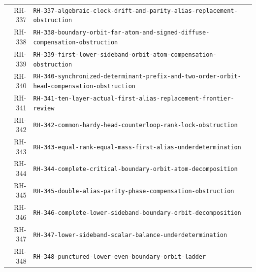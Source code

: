 \begin{longtable}{r >{\raggedright\arraybackslash}p{}}
RH-337 & \texttt{RH-\allowbreak{}337-\allowbreak{}algebraic-\allowbreak{}clock-\allowbreak{}drift-\allowbreak{}and-\allowbreak{}parity-\allowbreak{}alias-\allowbreak{}replacement-\allowbreak{}obstruction}\\
RH-338 & \texttt{RH-\allowbreak{}338-\allowbreak{}boundary-\allowbreak{}orbit-\allowbreak{}far-\allowbreak{}atom-\allowbreak{}and-\allowbreak{}signed-\allowbreak{}diffuse-\allowbreak{}compensation-\allowbreak{}obstruction}\\
RH-339 & \texttt{RH-\allowbreak{}339-\allowbreak{}first-\allowbreak{}lower-\allowbreak{}sideband-\allowbreak{}orbit-\allowbreak{}atom-\allowbreak{}compensation-\allowbreak{}obstruction}\\
RH-340 & \texttt{RH-\allowbreak{}340-\allowbreak{}synchronized-\allowbreak{}determinant-\allowbreak{}prefix-\allowbreak{}and-\allowbreak{}two-\allowbreak{}order-\allowbreak{}orbit-\allowbreak{}head-\allowbreak{}compensation-\allowbreak{}obstruction}\\
RH-341 & \texttt{RH-\allowbreak{}341-\allowbreak{}ten-\allowbreak{}layer-\allowbreak{}actual-\allowbreak{}first-\allowbreak{}alias-\allowbreak{}replacement-\allowbreak{}frontier-\allowbreak{}review}\\
RH-342 & \texttt{RH-\allowbreak{}342-\allowbreak{}common-\allowbreak{}hardy-\allowbreak{}head-\allowbreak{}counterloop-\allowbreak{}rank-\allowbreak{}lock-\allowbreak{}obstruction}\\
RH-343 & \texttt{RH-\allowbreak{}343-\allowbreak{}equal-\allowbreak{}rank-\allowbreak{}equal-\allowbreak{}mass-\allowbreak{}first-\allowbreak{}alias-\allowbreak{}underdetermination}\\
RH-344 & \texttt{RH-\allowbreak{}344-\allowbreak{}complete-\allowbreak{}critical-\allowbreak{}boundary-\allowbreak{}orbit-\allowbreak{}atom-\allowbreak{}decomposition}\\
RH-345 & \texttt{RH-\allowbreak{}345-\allowbreak{}double-\allowbreak{}alias-\allowbreak{}parity-\allowbreak{}phase-\allowbreak{}compensation-\allowbreak{}obstruction}\\
RH-346 & \texttt{RH-\allowbreak{}346-\allowbreak{}complete-\allowbreak{}lower-\allowbreak{}sideband-\allowbreak{}boundary-\allowbreak{}orbit-\allowbreak{}decomposition}\\
RH-347 & \texttt{RH-\allowbreak{}347-\allowbreak{}lower-\allowbreak{}sideband-\allowbreak{}scalar-\allowbreak{}balance-\allowbreak{}underdetermination}\\
RH-348 & \texttt{RH-\allowbreak{}348-\allowbreak{}punctured-\allowbreak{}lower-\allowbreak{}even-\allowbreak{}boundary-\allowbreak{}orbit-\allowbreak{}ladder}\\

\end{longtable}
